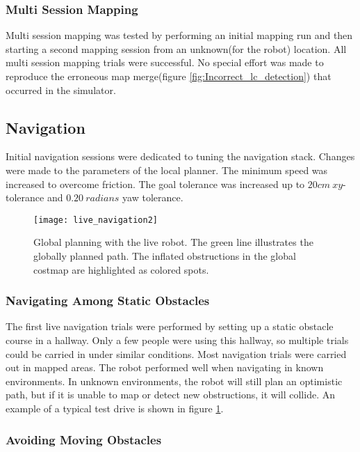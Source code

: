 \subsubsection{Multi Session Mapping}

Multi session mapping was tested by performing an initial mapping run and then starting a second mapping session from an unknown(for the robot) location. All multi session mapping trials were successful. No special effort was made to reproduce the erroneous map merge(figure \ref{fig:Incorrect_lc_detection}) that occurred in the simulator. 

\subsection{Navigation}

Initial navigation sessions were dedicated to tuning the navigation stack. Changes were made to the parameters of the local planner. The minimum speed was increased to overcome friction. The goal tolerance was increased up to $20cm \: xy$-tolerance and $0.20 \: radians$ yaw tolerance.

\begin{figure}[H]
	\centering
	\texttt{[image: live\_navigation2]}
	\caption{Global planning with the live robot. The green line illustrates the globally planned path. The inflated obstructions in the global costmap are highlighted as colored spots.}
	\label{fig:live_navigation2}
\end{figure} 

\subsubsection{Navigating Among Static Obstacles}

The first live navigation trials were performed by setting up a static obstacle course in a hallway. Only a few people were using this hallway, so multiple trials could be carried in under similar conditions. Most navigation trials were carried out in mapped areas. The robot performed well when navigating in known environments. In unknown environments, the robot will still plan an optimistic path, but if it is unable to map or detect new obstructions, it will collide. An example of a typical test drive is shown in figure \ref{fig:live_navigation2}.



\subsubsection{Avoiding Moving Obstacles}

